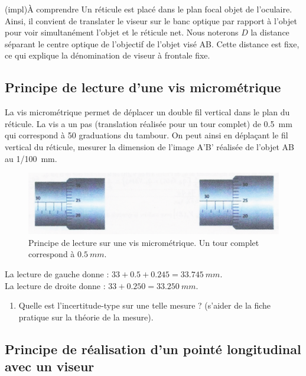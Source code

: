 \documentclass[../main/main.tex]{subfiles}
\begin{document}
\begin{tcb}(impl){À comprendre}
	Un réticule est placé dans le plan focal objet de l'oculaire. Ainsi, il
	convient de translater le viseur sur le banc optique par rapport à l'objet
	pour voir simultanément l'objet et le réticule net. Nous noterons $D$ la
	distance séparant le centre optique de l'objectif de l'objet visé AB.
	Cette distance est fixe, ce qui explique la dénomination de viseur à
	frontale fixe.
\end{tcb}

\subsection{Principe de lecture d'une vis micrométrique}

La vis micrométrique permet de déplacer un double fil vertical dans le plan du
réticule. La vis a un pas (translation réalisée pour un tour complet) de
\SI{0,5}{mm} qui correspond à 50 graduations du tambour. On peut ainsi en
déplaçant le fil vertical du réticule, mesurer la dimension de l'image A'B'
réalisée de l'objet AB au \SI{1/100}{mm}.

\begin{figure}[h]
	\centering
	\includegraphics[width=0.7\linewidth]{vis_micro}
	\captionsetup{justification=centering}
	\caption{Principe de lecture sur une vis micrométrique. Un tour complet
		correspond à $\SI{0,5}{mm}$.}
	\label{fig:vis_micro}
\end{figure}

La lecture de gauche donne : $33+\num{0,5}+\num{0,245} = \SI{33,745}{mm}$.\\
La lecture de droite donne : $33+\num{0,250} = \SI{33,250}{mm}$.

\begin{enumerate}[label=\clenumi]
	\item Quelle est l'incertitude-type sur une telle mesure ? (s'aider de la
	      fiche pratique sur la théorie de la mesure).
\end{enumerate}

\subsection{Principe de réalisation d'un pointé longitudinal avec un viseur}
\end{document}

